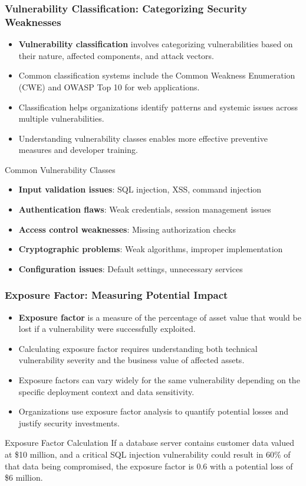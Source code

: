 \documentclass{beamer}
\begin{document}
\begin{frame}
\frametitle{Vulnerability Classification: Categorizing Security Weaknesses}
\begin{itemize}
\item \textbf{Vulnerability classification} involves categorizing vulnerabilities based on their nature, affected components, and attack vectors.
\item Common classification systems include the Common Weakness Enumeration (CWE) and OWASP Top 10 for web applications.
\item Classification helps organizations identify patterns and systemic issues across multiple vulnerabilities.
\item Understanding vulnerability classes enables more effective preventive measures and developer training.
\end{itemize}

\begin{block}{Common Vulnerability Classes}
\scriptsize
\begin{itemize}
\item \textbf{Input validation issues}: SQL injection, XSS, command injection
\item \textbf{Authentication flaws}: Weak credentials, session management issues
\item \textbf{Access control weaknesses}: Missing authorization checks
\item \textbf{Cryptographic problems}: Weak algorithms, improper implementation
\item \textbf{Configuration issues}: Default settings, unnecessary services
\end{itemize}
\end{block}
\end{frame}

\begin{frame}
\frametitle{Exposure Factor: Measuring Potential Impact}
\begin{itemize}
\item \textbf{Exposure factor} is a measure of the percentage of asset value that would be lost if a vulnerability were successfully exploited.
\item Calculating exposure factor requires understanding both technical vulnerability severity and the business value of affected assets.
\item Exposure factors can vary widely for the same vulnerability depending on the specific deployment context and data sensitivity.
\item Organizations use exposure factor analysis to quantify potential losses and justify security investments.
\end{itemize}

\begin{exampleblock}{Exposure Factor Calculation}
\scriptsize
If a database server contains customer data valued at \$10 million, and a critical SQL injection vulnerability could result in 60\% of that data being compromised, the exposure factor is 0.6 with a potential loss of \$6 million.
\end{exampleblock}
\end{frame}
\end{document}
